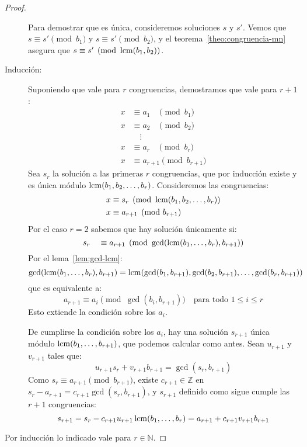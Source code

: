 \begin{proof}
\begin{description}
      Para demostrar que es única,
      consideremos soluciones \(s\) y \(s'\).
      Vemos que
      \(s \equiv s' \pmod{b_1}\)
      y \(s \equiv s' \pmod{b_2}\),
      y el teorema~\ref{theo:congruencia-mn} asegura que
      \(s \equiv s' \pmod{\operatorname{lcm}(b_1, b_2)}\).
    \item[Inducción:]
      Suponiendo que vale para \(r\) congruencias,
      demostramos que vale para \(r + 1\):
      \begin{align*}
	x &\equiv a_{1\phantom{+1}} \pmod{b_1} \\
	x &\equiv a_{2\phantom{+1}} \pmod{b_2} \\
	  &\quad \vdots		 \\
	x &\equiv a_{r\phantom{+1}} \pmod{b_r} \\
	x &\equiv a_{r + 1} \pmod{b_{r + 1}}
      \end{align*}
      Sea \(s_r\) la solución a las primeras \(r\) congruencias,
      que por inducción existe
      y es única módulo \(\operatorname{lcm}(b_1, b_2, \dotsc, b_r)\).
      Consideremos las congruencias:
      \begin{align*}
	x &\equiv s_r \pmod{\operatorname{lcm}(b_1, b_2, \dotsc, b_r)} \\
	x &\equiv a_{r + 1} \pmod{b_{r + 1}}
      \end{align*}
      Por el caso \(r = 2\) sabemos que hay solución únicamente si:
      \begin{equation*}
	s_{r\phantom{+1}} \equiv a_{r + 1}
	  \pmod{\gcd(\operatorname{lcm}(b_1, \dotsc, b_r), b_{r + 1})}
      \end{equation*}
      Por el lema~\ref{lem:gcd-lcm}:
      \begin{equation*}
	\gcd(\operatorname{lcm}(b_1, \dotsc, b_r), b_{r + 1})
	  = \operatorname{lcm}(\gcd(b_1, b_{r + 1}), \gcd(b_2, b_{r + 1}),
		 \dotsc, \gcd(b_r, b_{r + 1}))
      \end{equation*}
      que es equivalente a:
      \begin{equation*}
	a_{r + 1} \equiv a_i \pmod{\gcd(b_i, b_{r + 1})}
	  \quad\text{para todo \(1 \le i \le r\)}
      \end{equation*}
      Esto extiende la condición sobre los \(a_i\).

      De cumplirse la condición sobre los \(a_i\),
      hay una solución \(s_{r + 1}\) única módulo
      \(\operatorname{lcm}(b_1, \dotsc, b_{r + 1})\),
      que podemos calcular como antes.
      Sean \(u_{r + 1}\) y \(v_{r + 1}\) tales que:
      \begin{equation*}
	u_{r + 1} s_r + v_{r + 1} b_{r + 1}
	  = \gcd(s_r, b_{r + 1})
      \end{equation*}
      Como \(s_r \equiv a_{r + 1} \pmod{b_{r + 1}}\),
      existe \(c_{r + 1} \in \mathbb{Z}\) en
      \(s_r - a_{r + 1} = c_{r + 1} \gcd(s_r, b_{r + 1})\),
      y \(s_{r + 1}\)
      definido como sigue cumple las \(r + 1\) congruencias:
      \begin{equation*}
	s_{r + 1}
	  = s_r - c_{r + 1} u_{r + 1} \operatorname{lcm}(b_1, \dotsc, b_r)
	  = a_{r + 1} + c_{r + 1} v_{r + 1} b_{r + 1}
      \end{equation*}
    \end{description}
    Por inducción lo indicado vale para \(r \in \mathbb{N}\).
  \end{proof}

